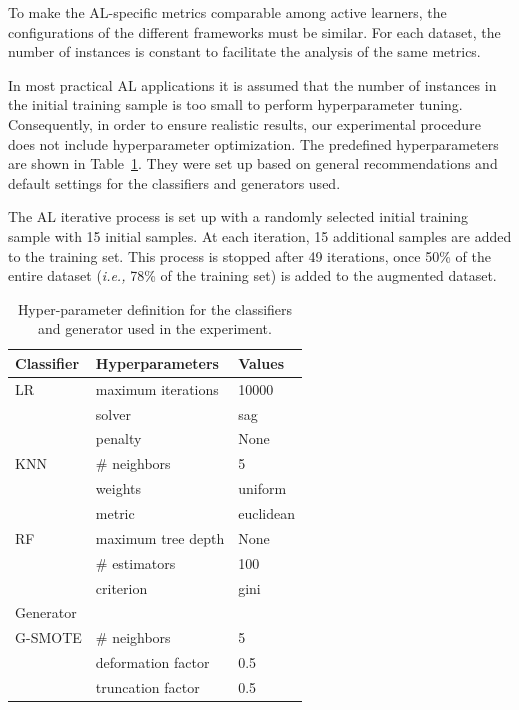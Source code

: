\documentclass[remotesensing,article,submit,moreauthors,pdftex]{Definitions/mdpi}
\begin{document}
\begin{paracol}{2}
\linenumbers
\switchcolumn

To make the AL-specific metrics comparable among active learners, the
configurations of the different frameworks must be similar. For each dataset,
the number of instances is constant to facilitate the analysis of the same
metrics. 

In most practical AL applications it is assumed that the number of instances 
in the initial training sample is too small to perform hyperparameter tuning.
Consequently, in order to ensure realistic results, our experimental procedure
does not include hyperparameter optimization. The predefined hyperparameters
are shown in Table~\ref{tab:grid}. They were set up based on general
recommendations and default settings for the classifiers and generators used.

The AL iterative process is set up with a randomly selected initial training
sample with 15 initial samples. At each iteration, 15 additional samples are
added to the training set. This process is stopped after 49 iterations, once
50\% of the entire dataset (\textit{i.e.,} 78\% of the training set) is added
to the augmented dataset.

\begin{table}[H]
	\centering
	\begin{tabular}{lll}
		\toprule
		Classifier & Hyperparameters      & Values             \\
		\midrule
		LR         & maximum iterations   & 10000              \\
		           & solver               & sag                \\
                   & penalty              & None               \\
		KNN        & \# neighbors         & 5                  \\
                   & weights              & uniform            \\
                   & metric               & euclidean          \\
		RF         & maximum tree depth   & None               \\
		           & \# estimators        & 100                \\
                   & criterion            & gini               \\
		\toprule
		Generator  &                      &                    \\
		\midrule
		G-SMOTE    & \# neighbors         & 5                  \\
                   & deformation factor   & 0.5                \\
                   & truncation factor    & 0.5                \\
		\bottomrule
	\end{tabular}
    \caption{\label{tab:grid}Hyper-parameter definition for the classifiers and
    generator used in the experiment.}
\end{table}


\end{paracol}
\end{document}
